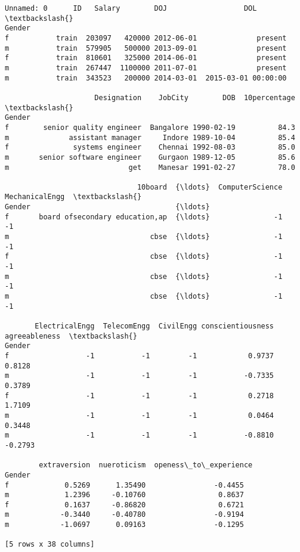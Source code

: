 \documentclass[11pt]{article}
\makeatletter
\newcommand{\boxspacing}{\kern\kvtcb@left@rule\kern\kvtcb@boxsep}
\newcommand{\prompt}[4]{
        \ttfamily\llap{{\color{#2}[#3]:\hspace{3pt}#4}}\vspace{-\baselineskip}
    }
\makeatother
\begin{document}
            \begin{tcolorbox}[breakable, size=fbox, boxrule=.5pt, pad at break*=1mm, opacityfill=0]
\prompt{Out}{outcolor}{55}{\boxspacing}
\begin{Verbatim}[commandchars=\\\{\}]
       Unnamed: 0      ID   Salary        DOJ                  DOL  \textbackslash{}
Gender
f           train  203097   420000 2012-06-01              present
m           train  579905   500000 2013-09-01              present
f           train  810601   325000 2014-06-01              present
m           train  267447  1100000 2011-07-01              present
m           train  343523   200000 2014-03-01  2015-03-01 00:00:00

                     Designation    JobCity        DOB  10percentage  \textbackslash{}
Gender
f        senior quality engineer  Bangalore 1990-02-19          84.3
m              assistant manager     Indore 1989-10-04          85.4
f               systems engineer    Chennai 1992-08-03          85.0
m       senior software engineer    Gurgaon 1989-12-05          85.6
m                            get    Manesar 1991-02-27          78.0

                               10board  {\ldots}  ComputerScience  MechanicalEngg  \textbackslash{}
Gender                                  {\ldots}
f       board ofsecondary education,ap  {\ldots}               -1              -1
m                                 cbse  {\ldots}               -1              -1
f                                 cbse  {\ldots}               -1              -1
m                                 cbse  {\ldots}               -1              -1
m                                 cbse  {\ldots}               -1              -1

       ElectricalEngg  TelecomEngg  CivilEngg conscientiousness agreeableness  \textbackslash{}
Gender
f                  -1           -1         -1            0.9737        0.8128
m                  -1           -1         -1           -0.7335        0.3789
f                  -1           -1         -1            0.2718        1.7109
m                  -1           -1         -1            0.0464        0.3448
m                  -1           -1         -1           -0.8810       -0.2793

        extraversion  nueroticism  openess\_to\_experience
Gender
f             0.5269      1.35490                -0.4455
m             1.2396     -0.10760                 0.8637
f             0.1637     -0.86820                 0.6721
m            -0.3440     -0.40780                -0.9194
m            -1.0697      0.09163                -0.1295

[5 rows x 38 columns]
\end{Verbatim}
\end{tcolorbox}
        
\end{document}
